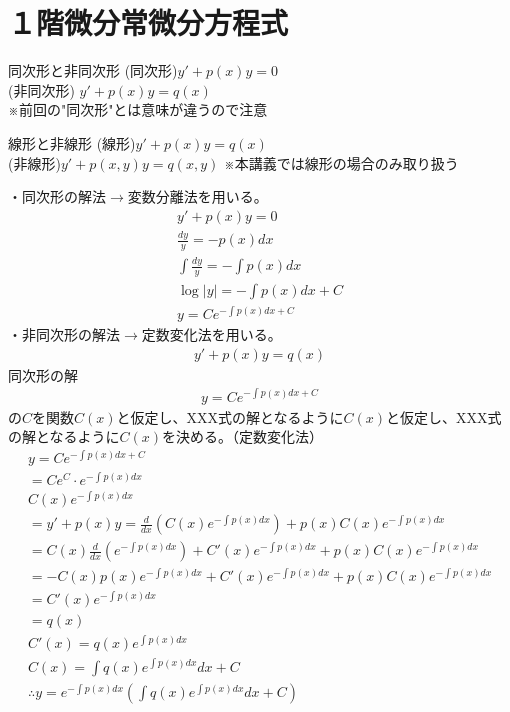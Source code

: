 \documentclass{jsarticle}
\begin{document}
\section{１階微分常微分方程式}
\begin{itembox}[l]{同次形と非同次形}
(同次形)\quad $y'+p(x)y=0$\\
(非同次形) $y'+p(x)y=q(x)$\\
※前回の"同次形"とは意味が違うので注意
\end{itembox}
\begin{itembox}[l]{線形と非線形}
(線形)\quad $y'+p(x)y=q(x)$\\
(非線形)$y'+p(x,y)y=q(x,y)$
※本講義では線形の場合のみ取り扱う
\end{itembox}
・同次形の解法$\rightarrow$変数分離法を用いる。\\
\begin{eqnarray}
y'+p(x)y=0\\
\frac{dy}{y}=-p(x)dx \\
\int \frac{dy}{y}=-\int p(x)dx \\
\log |y| = -\int p(x)dx +C\\
y=Ce^{-\int p(x)dx +C}
\end{eqnarray}
・非同次形の解法$\rightarrow$定数変化法を用いる。\\
\begin{eqnarray}
y'+p(x)y=q(x)
\end{eqnarray}
同次形の解
\begin{eqnarray}
y=Ce^{-\int p(x)dx +C}
\end{eqnarray}
の$C$を関数$C(x)$と仮定し、XXX式の解となるように$C(x)$と仮定し、XXX式の解となるように$C(x)$を決める。（定数変化法）
\begin{eqnarray}
y=Ce^{-\int p(x)dx +C}\\
=Ce^C\cdot e^{-\int p(x)dx}\\
C(x)e^{-\int p(x)dx}\\
=y'+p(x)y=\frac{d}{dx}\left(C(x)e^{-\int p(x)dx}\right)+p(x)C(x)e^{-\int p(x)dx}\\
=C(x)\frac{d}{dx}\left(e^{-\int p(x)dx}\right)+C'(x)e^{-\int p(x)dx}+p(x)C(x)e^{-\int p(x)dx}\\
=-C(x)p(x)e^{-\int p(x)dx}+C'(x)e^{-\int p(x)dx}+p(x)C(x)e^{-\int p(x)dx}\\
=C'(x)e^{-\int p(x)dx}\\
=q(x)\\
C'(x)=q(x)e^{\int p(x)dx}\\
C(x)=\int q(x)e^{\int p(x)dx}dx + C\\
\therefore y=e^{-\int p(x)dx}\left(\int q(x)e^{\int p(x)dx}dx + C\right)
\end{eqnarray}
\end{document}

